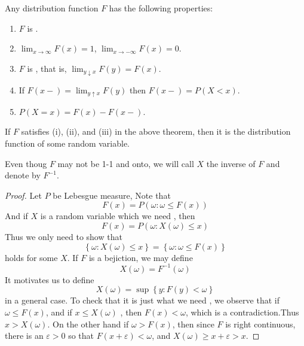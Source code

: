 \documentclass[../main.tex]{subfiles}
\begin{document}
\begin{theorem}{}{}
Any distribution function $F$ has the following properties:
\begin{enumerate}
\item[(i)] $F$ is .
\item[(ii)] $\lim_{x\to\infty} F(x) = 1$, $\lim_{x\to-\infty} F(x) = 0$.
\item[(iii)] $F$ is , that is, $\lim_{y\downarrow x} F(y) = F(x)$.
\item[(iv)] If $F(x-) = \lim_{y\uparrow x} F(y)$ then $F(x-) = P(X < x)$.
\item[(v)] $P(X = x) = F(x) - F(x-)$.
\end{enumerate}
\end{theorem}

\begin{theorem}{}{}
    If \(  F  \) satisfies (i), (ii), and (iii) in the above theorem, then it is the distribution function of some random variable.  
\end{theorem}

\begin{remark}
    Even thoug \(  F  \) may not be 1-1 and onto, we will call \(  X  \) the inverse of \(  F  \) and denote by \(  F^{-1}   \).     
\end{remark}

\begin{proof}
    Let \(  P  \) be Lebesgue measure,  Note that \[
    F\left( x \right)= P\left(  \omega :  \omega \le F\left( x \right)  \right)   
    \] And if \(  X  \) is a random variable which we need , then \[
    F\left( x \right)= P\left(  \omega :X\left(  \omega  \right)\le x   \right)  
    \] Thus we only need to show that \[
    \left\{  \omega :X\left(  \omega  \right)\le x  \right\}= \left\{  \omega : \omega \le F\left( x \right)  \right\}
    \] holds for some \(  X  \).  If \(  F  \) is a bejiction, we may define \[
    X\left(  \omega  \right)= F^{-1} \left(  \omega  \right)  
    \] It motivates us to define \[
    X\left(  \omega  \right)= \sup \left\{ y: F\left( y \right)<  \omega   \right\} 
    \] in a general case. To check that it is just what we need , we observe that if \(   \omega \le F\left( x \right)   \), and if \(  x\le X\left(  \omega  \right)   \) , then \(  F\left( x \right)<  \omega    \), which is a contradiction.Thus \(  x > X\left(  \omega  \right)   \). On the other hand if \(   \omega > F\left( x \right)   \), then since \(  F  \) is right continuous, there is an \(   \varepsilon > 0  \) so that \(  F\left( x+  \varepsilon  \right)<  \omega    \), and \(  X\left(  \omega  \right)\ge x+  \varepsilon > x   \).     
\end{proof}
\end{document}
